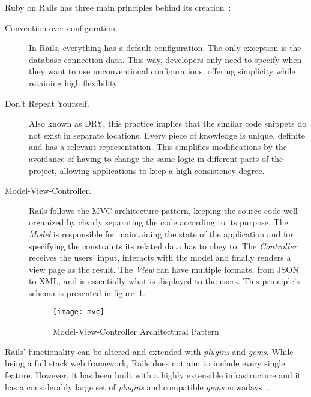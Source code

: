 Ruby on Rails has three main principles behind its creation~\cite{agile_webdevelopment_with_rails, ruby_on_rails_principles}:
\begin{description}
\item[Convention over configuration.] In Rails, everything has a default configuration. The only exception is the database connection data. This way, developers only need to specify when they want to use unconventional configurations, offering simplicity while retaining high flexibility.
\item[Don't Repeat Yourself.] Also known as DRY, this practice implies that the similar code snippets do not exist in separate locations. Every piece of knowledge is unique, definite and has a relevant representation. This simplifies modifications by the avoidance of having to change the same logic in different parts of the project, allowing applications to keep a high consistency degree.
\item[Model-View-Controller.] Rails follows the MVC architecture pattern, keeping the source code well organized by clearly separating the code according to its purpose. The \textit{Model} is responsible for maintaining the state of the application and for specifying the constraints its related data has to obey to. The \textit{Controller} receives the users' input, interacts with the model and finally renders a view page as the result. The \textit{View} can have multiple formats, from JSON to XML, and is essentially what is displayed to the users. This principle's schema is presented in figure~\ref{fig:mvc}.
\begin{figure}[h]
  \centering
    \texttt{[image: mvc]}
    \caption{Model-View-Controller Architectural Pattern} \label{fig:mvc}
\end{figure}
\end{description}
Rails' functionality can be altered and extended with \textit{plugins} and \textit{gems}. While being a full stack web framework, Rails does not aim to include every single feature. However, it has been built with a highly extensible infrastructure and it has a considerably large set of \textit{plugins} and compatible \textit{gems} nowadays~\cite{rails_magazine_1}.


